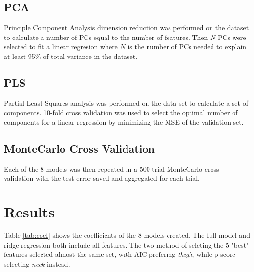 \documentclass[12pt,letterpaper]{article}
\begin{document}
\subsection*{PCA}
Principle Component Analysis dimension reduction was performed on the dataset to calculate a number of PCs equal to the number of features. Then $N$ PCs were selected to fit a linear regresion where $N$ is the number of PCs needed to explain at least 95\% of total variance in the dataset. 

\subsection*{PLS}
Partial Least Squares analysis was performed on the data set to calculate a set of components. 10-fold cross validation was used to select the optimal number of components for a linear regression by minimizing the MSE of the validation set.

\subsection*{MonteCarlo Cross Validation}
Each of the 8 models was then repeated in a 500 trial MonteCarlo cross validation with the test error saved and aggregated for each trial. 

\section*{Results}

Table \ref{tab:coef} shows the coefficients of the 8 models created. The full model and ridge regression both include all features. The two method of selcting the 5 "best" features selected almost the same set, with AIC prefering \textit{thigh}, while p-score selecting \textit{neck} instead.
\end{document}
